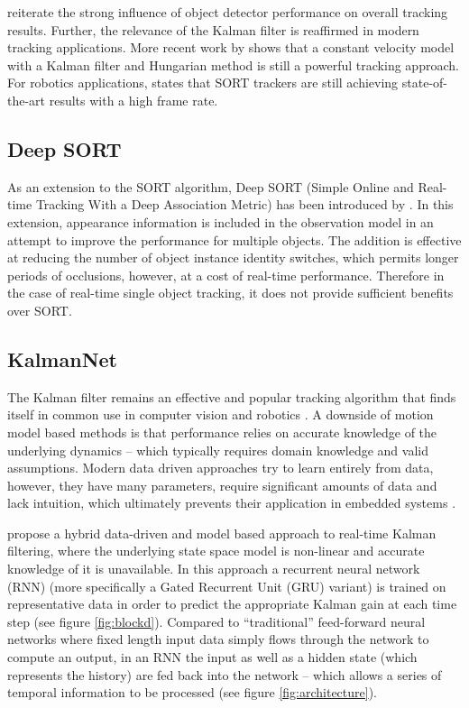 \documentclass[a4paper,twoside,12pt]{report}
\begin{document}
\cite{sort} reiterate the strong influence of object detector performance on overall tracking results. Further, the relevance of the Kalman filter is reaffirmed in modern tracking applications. More recent work by \cite{sort++} shows that a constant velocity model with a Kalman filter and Hungarian method is still a powerful tracking approach. For robotics applications, \cite{sortrob} states that SORT trackers are still achieving state-of-the-art results with a high frame rate.

\subsection{Deep SORT}

As an extension to the SORT algorithm, Deep SORT (Simple Online and Real-time Tracking With a Deep Association Metric) has been introduced by \cite{deepsort}. In this extension, appearance information is included in the observation model in an attempt to improve the performance for multiple objects. The addition is effective at reducing the number of object instance identity switches, which permits longer periods of occlusions, however, at a cost of real-time performance. Therefore in the case of real-time single object tracking, it does not provide sufficient benefits over SORT. 

\pagebreak
\subsection{KalmanNet}

The Kalman filter remains an effective and popular tracking algorithm that finds itself in common use in computer vision and robotics \citep{kalmanforever}. A downside of motion model based methods is that performance relies on accurate knowledge of the underlying dynamics -- which typically requires domain knowledge and valid assumptions. Modern data driven approaches try to learn entirely from data, however, they have many parameters, require significant amounts of data and lack intuition, which ultimately prevents their application in embedded systems \citep{kalmannet}.

\cite{kalmannet} propose a hybrid data-driven and model based approach to real-time Kalman filtering, where the underlying state space model is non-linear and accurate knowledge of it is unavailable. In this approach a recurrent neural network (RNN) (more specifically a Gated Recurrent Unit (GRU) variant) is trained on representative data in order to predict the appropriate Kalman gain at each time step  (see figure \ref{fig:blockd}). Compared to ``traditional'' feed-forward neural networks where fixed length input data simply flows through the network to compute an output, in an RNN the input as well as a hidden state (which represents the history) are fed back into the network -- which allows a series of temporal information to be processed  (see figure \ref{fig:architecture}). 
\end{document}
